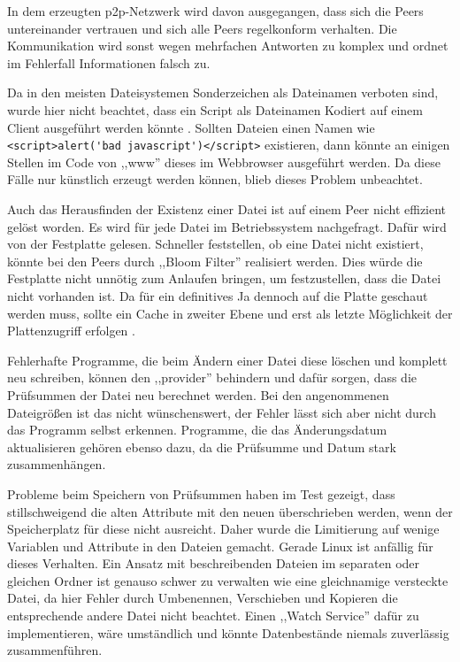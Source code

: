 \documentclass[oneside, ngerman, toc=bibliography,bibliography=totoc,listof=entryprefix, open=right,numbers=noenddot,fontsize=12pt]{scrbook}
\begin{document}
In dem erzeugten \acrshort{p2p}-Netzwerk wird davon ausgegangen, dass sich die Peers untereinander vertrauen und sich alle Peers regelkonform verhalten.
Die Kommunikation wird sonst wegen mehrfachen Antworten zu komplex und ordnet im Fehlerfall Informationen falsch zu.

Da in den meisten Dateisystemen Sonderzeichen als Dateinamen verboten sind, wurde hier nicht beachtet, dass ein Script als Dateinamen Kodiert auf einem Client ausgeführt werden könnte \cite{winforbit}. Sollten Dateien einen Namen wie \verb|<script>alert('bad javascript')</script>| existieren, dann könnte an einigen Stellen im Code von ,,www'' dieses im Webbrowser ausgeführt werden. Da diese Fälle nur künstlich erzeugt werden können, blieb dieses Problem unbeachtet.

Auch das Herausfinden der Existenz einer Datei ist auf einem Peer nicht effizient gelöst worden.
Es wird für jede Datei im Betriebssystem nachgefragt. Dafür wird von der Festplatte gelesen.
Schneller feststellen, ob eine Datei nicht existiert, könnte bei den Peers durch ,,Bloom Filter'' realisiert werden. Dies würde die Festplatte nicht unnötig  zum Anlaufen bringen, um festzustellen, dass die Datei nicht vorhanden ist. Da für ein definitives Ja dennoch auf die Platte geschaut werden muss, sollte ein Cache in zweiter Ebene und erst als letzte Möglichkeit der Plattenzugriff erfolgen \cite{bejeck2013getting}.  

Fehlerhafte Programme, die beim Ändern einer Datei diese löschen und komplett neu schreiben, können den ,,provider'' behindern und dafür sorgen, dass die Prüfsummen der Datei neu berechnet werden. Bei den angenommenen Dateigrößen ist das nicht wünschenswert, der Fehler lässt sich aber nicht durch das Programm selbst erkennen. Programme, die das Änderungsdatum aktualisieren gehören ebenso dazu, da die Prüfsumme und Datum stark zusammenhängen.

Probleme beim Speichern von Prüfsummen haben im Test gezeigt, dass stillschweigend die alten Attribute mit den neuen überschrieben werden, wenn der Speicherplatz für diese nicht ausreicht. Daher wurde die Limitierung auf wenige Variablen und Attribute in den Dateien gemacht. Gerade Linux ist anfällig für dieses Verhalten.
Ein Ansatz mit beschreibenden Dateien im separaten oder gleichen Ordner ist genauso schwer zu verwalten wie eine gleichnamige versteckte Datei, da hier Fehler durch Umbenennen, Verschieben und Kopieren die entsprechende andere Datei nicht beachtet. Einen ,,Watch Service'' dafür zu implementieren, wäre umständlich und könnte Datenbestände niemals zuverlässig zusammenführen.
\end{document}
